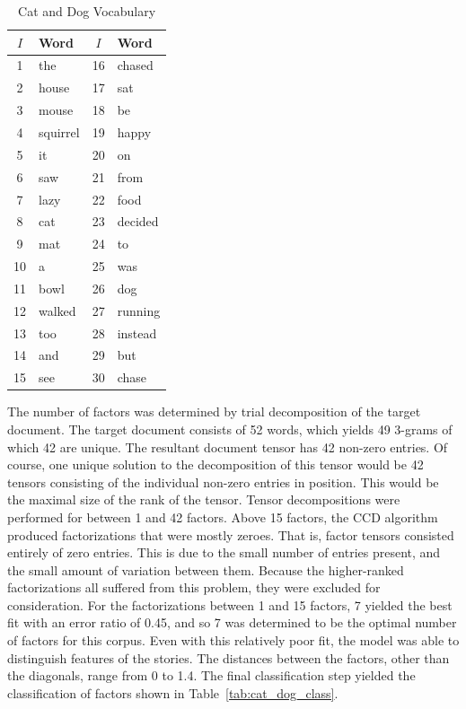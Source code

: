 \documentclass[../ut-dissertation.tex]{subfiles}
\begin{document}
\begin{table}[p]
  \centering
  \caption{Cat and Dog Vocabulary}\label{tab:catdog_vocabulary}
  \begin{tabular}{|c|l||c|l|}
    \hline
    $I$ & Word & $I$ & Word\\ 
    \hline
    1 & the & 16 & chased \\
    2 & house & 17 & sat \\
    3 & mouse & 18 & be \\
    4 & squirrel & 19 & happy \\
    5 & it & 20 & on\\
    6 & saw & 21 & from \\
    7 & lazy & 22 & food \\
    8 & cat & 23 & decided \\
    9 & mat & 24 & to\\
   10 & a & 25 & was \\
   11 & bowl & 26 & dog \\
   12 & walked & 27 & running \\
   13 & too & 28 & instead \\
   14 & and & 29 & but \\
   15 & see & 30 & chase\\
    \hline
  \end{tabular}
\end{table}
\FloatBarrier

The number of factors was determined by trial decomposition of the
target document.  The target document consists of 52 words, which
yields 49 3-grams of which 42 are unique.  The resultant document
tensor has 42 non-zero entries.  Of course, one unique solution to the
decomposition of this tensor would be 42 tensors consisting of the
individual non-zero entries in position.  This would be the maximal
size of the rank of the tensor.  Tensor decompositions were performed
for between 1 and 42 factors.  Above 15 factors, the CCD algorithm
produced factorizations that were mostly zeroes.  That is, factor
tensors consisted entirely of zero entries.  This is due to the small
number of entries present, and the small amount of variation between
them.  Because the higher-ranked factorizations all suffered from this
problem, they were excluded for consideration.  For the factorizations
between 1 and 15 factors, 7 yielded the best fit with an error ratio
of 0.45, and so 7 was determined to be the optimal number of factors
for this corpus. Even with this relatively poor fit, the model was
able to distinguish features of the stories.  The distances between
the factors, other than the diagonals, range from 0 to 1.4.  The final
classification step yielded the classification of factors shown in
Table~\ref{tab:cat_dog_class}.
\end{document}
